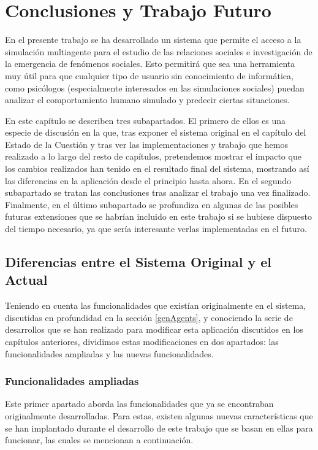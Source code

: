 \chapter{Conclusiones y Trabajo Futuro}
\label{cap:conclusiones}

En el presente trabajo se ha desarrollado un sistema que permite el acceso a la simulación multiagente para el estudio de las relaciones sociales e investigación de la emergencia de fenómenos sociales. Esto permitirá que sea una herramienta muy útil para que cualquier tipo de usuario sin conocimiento de informática, como psicólogos (especialmente interesados en las simulaciones sociales) puedan analizar el comportamiento humano simulado y predecir ciertas situaciones.

En este capítulo se describen tres subapartados. El primero de ellos es una especie de discusión en la que, tras exponer el sistema original en el capítulo del Estado de la Cuestión y tras ver las implementaciones y trabajo que hemos realizado a lo largo del resto de capítulos, pretendemos mostrar el impacto que los cambios realizados han tenido en el resultado final del sistema, mostrando así las diferencias en la aplicación desde el principio hasta ahora. En el segundo subapartado se tratan las conclusiones tras analizar el trabajo una vez finalizado. Finalmente, en el último subapartado se profundiza en algunas de las posibles futuras extensiones que se habrían incluido en este trabajo si se hubiese dispuesto del tiempo necesario, ya que sería interesante verlas implementadas en el futuro.

\section{Diferencias entre el Sistema Original y el Actual}

Teniendo en cuenta las funcionalidades que existían originalmente en el sistema, discutidas en profundidad en la sección \ref{genAgents}, y conociendo la serie de desarrollos que se han realizado para modificar esta aplicación discutidos en los capítulos anteriores, dividimos estas modificaciones en dos apartados: las funcionalidades ampliadas y las nuevas funcionalidades.

\subsection{Funcionalidades ampliadas}
Este primer apartado aborda las funcionalidades que ya se encontraban originalmente desarrolladas. Para estas, existen algunas nuevas características que se han implantado durante el desarrollo de este trabajo que se basan en ellas para funcionar, las cuales se mencionan a continuación.

